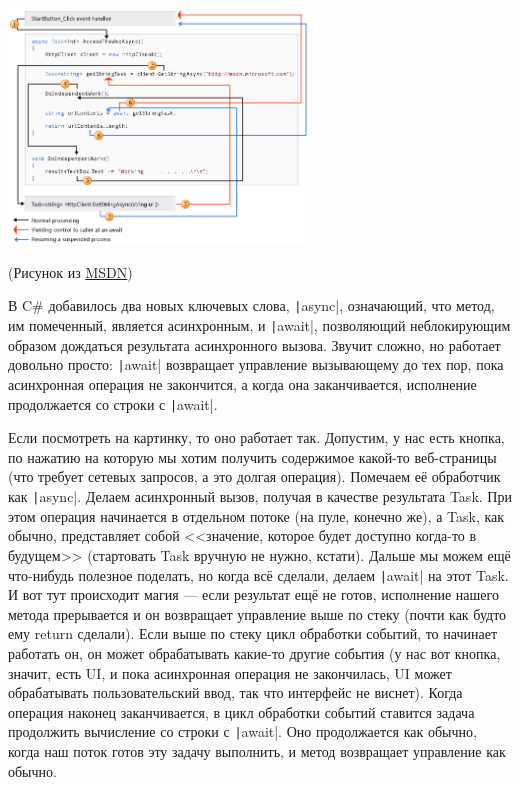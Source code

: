 \documentclass{../../text-style}
\begin{document}
\begin{center}
    \includegraphics[width=0.6\textwidth]{asyncAwait.png}

    \begin{footnotesize}(Рисунок из \href{https://msdn.microsoft.com/library/hh191443(vs.110).aspx}{MSDN})\end{footnotesize}
\end{center}

В C\# добавилось два новых ключевых слова, \texttt|async|, означающий, что метод, им помеченный, является асинхронным, и \texttt|await|, позволяющий неблокирующим образом дождаться результата асинхронного вызова. Звучит сложно, но работает довольно просто: \texttt|await| возвращает управление вызывающему до тех пор, пока асинхронная операция не закончится, а когда она заканчивается, исполнение продолжается со строки с \texttt|await|. 

Если посмотреть на картинку, то оно работает так. Допустим, у нас есть кнопка, по нажатию на которую мы хотим получить содержимое какой-то веб-страницы (что требует сетевых запросов, а это долгая операция). Помечаем её обработчик как \texttt|async|. Делаем асинхронный вызов, получая в качестве результата Task. При этом операция начинается в отдельном потоке (на пуле, конечно же), а Task, как обычно, представляет собой <<значение, которое будет доступно когда-то в будущем>> (стартовать Task вручную не нужно, кстати). Дальше мы можем ещё что-нибудь полезное поделать, но когда всё сделали, делаем \texttt|await| на этот Task. И вот тут происходит магия --- если результат ещё не готов, исполнение нашего метода прерывается и он возвращает управление выше по стеку (почти как будто ему return сделали). Если выше по стеку цикл обработки событий, то начинает работать он, он может обрабатывать какие-то другие события (у нас вот кнопка, значит, есть UI, и пока асинхронная операция не закончилась, UI может обрабатывать пользовательский ввод, так что интерфейс не виснет). Когда операция наконец заканчивается, в цикл обработки событий ставится задача продолжить вычисление со строки с \texttt|await|. Оно продолжается как обычно, когда наш поток готов эту задачу выполнить, и метод возвращает управление как обычно.
\end{document}
